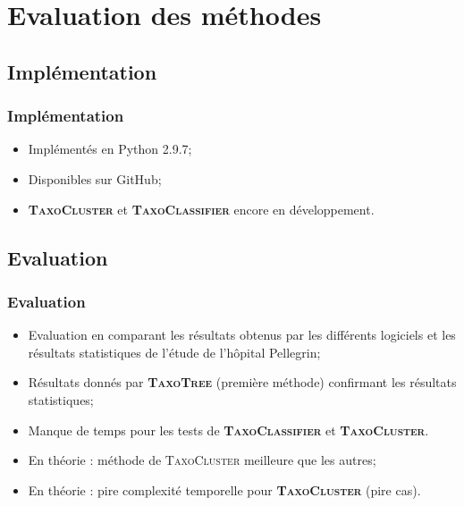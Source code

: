 \documentclass{beamer}
\begin{document}
\section{Evaluation des méthodes}

\begin{frame}
\tableofcontents[currentsection]
\end{frame}

\subsection{Implémentation}

\begin{frame}
\tableofcontents[currentsubsection]
\end{frame}

\begin{frame}
\frametitle{Implémentation}

\begin{itemize}
\item Implémentés en Python 2.9.7;
\bigskip
\pause
\item Disponibles sur GitHub;
\bigskip
\pause
\item \textsc{\bf TaxoCluster} et \textsc{\bf TaxoClassifier} encore en développement.
\end{itemize}

\end{frame}

\subsection{Evaluation}

\begin{frame}
\tableofcontents[currentsubsection]
\end{frame}

\begin{frame}
\frametitle{Evaluation}

\begin{itemize}
\item Evaluation en comparant les résultats obtenus par les différents logiciels et les résultats statistiques de l'étude de l'hôpital Pellegrin;
\bigskip
\pause
\item Résultats donnés par \textsc{\bf TaxoTree} (première méthode) confirmant les résultats statistiques;
\bigskip
\pause
\item Manque de temps pour les tests de \textsc{\bf TaxoClassifier} et \textsc{\bf TaxoCluster}.
\bigskip
\pause
\item En théorie : méthode de \textsc{TaxoCluster} meilleure que les autres;
\bigskip
\pause
\item En théorie : pire complexité temporelle pour \textsc{\bf TaxoCluster} (pire cas).
\end{itemize}

\end{frame}
\end{document}
